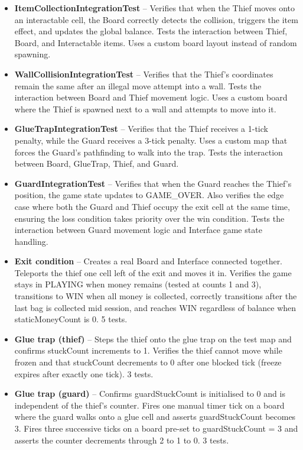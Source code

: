 \documentclass[12pt]{article}
\begin{document}
\begin{itemize}

\item \textbf{ItemCollectionIntegrationTest} -- Verifies that when the Thief moves onto an interactable cell, the Board correctly detects the collision, triggers the item effect, and updates the global balance. Tests the interaction between Thief, Board, and Interactable items. Uses a custom board layout instead of random spawning.

\item \textbf{WallCollisionIntegrationTest} -- Verifies that the Thief's coordinates remain the same after an illegal move attempt into a wall. Tests the interaction between Board and Thief movement logic. Uses a custom board where the Thief is spawned next to a wall and attempts to move into it.

\item \textbf{GlueTrapIntegrationTest} -- Verifies that the Thief receives a 1-tick penalty, while the Guard receives a 3-tick penalty. Uses a custom map that forces the Guard's pathfinding to walk into the trap. Tests the interaction between Board, GlueTrap, Thief, and Guard.

\item \textbf{GuardIntegrationTest} -- Verifies that when the Guard reaches the Thief's position, the game state updates to GAME\_OVER. Also verifies the edge case where both the Guard and Thief occupy the exit cell at the same time, ensuring the loss condition takes priority over the win condition. Tests the interaction between Guard movement logic and Interface game state handling.

\item \textbf{Exit condition} -- Creates a real Board and Interface connected together. Teleports the thief one cell left of the exit and moves it in. Verifies the game stays in PLAYING when money remains (tested at counts 1 and 3), transitions to WIN when all money is collected, correctly transitions after the last bag is collected mid session, and reaches WIN regardless of balance when staticMoneyCount is 0. 5 tests.

\item \textbf{Glue trap (thief)} -- Steps the thief onto the glue trap on the test map and confirms stuckCount increments to 1. Verifies the thief cannot move while frozen and that stuckCount decrements to 0 after one blocked tick (freeze expires after exactly one tick). 3 tests.

\item \textbf{Glue trap (guard)} -- Confirms guardStuckCount is initialised to 0 and is independent of the thief's counter. Fires one manual timer tick on a board where the guard walks onto a glue cell and asserts guardStuckCount becomes 3. Fires three successive ticks on a board pre-set to guardStuckCount = 3 and asserts the counter decrements through 2 to 1 to 0. 3 tests.

\end{itemize}
\end{document}
